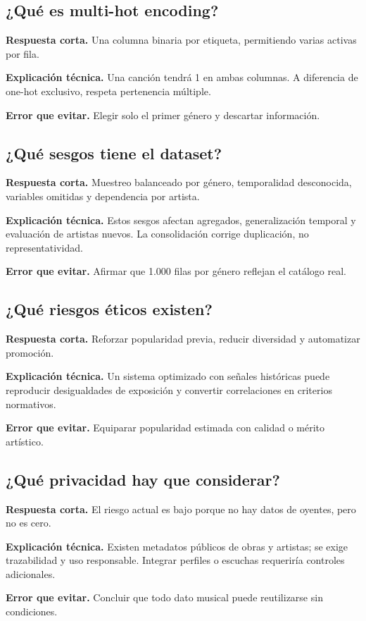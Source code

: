 \subsection*{¿Qué es multi-hot encoding?}
\textbf{Respuesta corta.} Una columna binaria por etiqueta, permitiendo varias activas por fila.\par
\textbf{Explicación técnica.} Una canción  tendrá 1 en ambas columnas. A diferencia de
one-hot exclusivo, respeta pertenencia múltiple.\par
\textbf{Error que evitar.} Elegir solo el primer género y descartar información.

\subsection*{¿Qué sesgos tiene el dataset?}
\textbf{Respuesta corta.} Muestreo balanceado por género, temporalidad desconocida, variables
omitidas y dependencia por artista.\par
\textbf{Explicación técnica.} Estos sesgos afectan agregados, generalización temporal y evaluación
de artistas nuevos. La consolidación corrige duplicación, no representatividad.\par
\textbf{Error que evitar.} Afirmar que 1.000 filas por género reflejan el catálogo real.

\subsection*{¿Qué riesgos éticos existen?}
\textbf{Respuesta corta.} Reforzar popularidad previa, reducir diversidad y automatizar promoción.\par
\textbf{Explicación técnica.} Un sistema optimizado con señales históricas puede reproducir
desigualdades de exposición y convertir correlaciones en criterios normativos.\par
\textbf{Error que evitar.} Equiparar popularidad estimada con calidad o mérito artístico.

\subsection*{¿Qué privacidad hay que considerar?}
\textbf{Respuesta corta.} El riesgo actual es bajo porque no hay datos de oyentes, pero no es cero.\par
\textbf{Explicación técnica.} Existen metadatos públicos de obras y artistas; se exige trazabilidad y
uso responsable. Integrar perfiles o escuchas requeriría controles adicionales.\par
\textbf{Error que evitar.} Concluir que todo dato musical puede reutilizarse sin condiciones.

